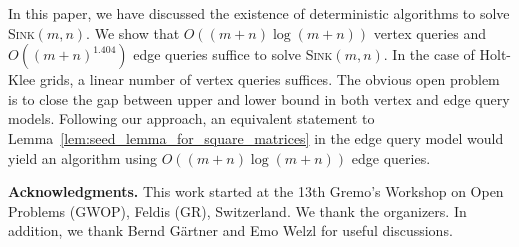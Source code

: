 \documentclass[runningheads,a4paper]{llncs}
\newcommand{\sinkmn}{\textsc{Sink}$(m,n)$\xspace}
\begin{document}
In this paper, we have discussed the existence of deterministic algorithms to solve \sinkmn. 
We show that $O((m+n)\log(m+n))$ vertex queries and $O((m+n)^{1.404})$ edge queries suffice to solve \sinkmn. In the case of Holt-Klee grids, a linear number of vertex queries suffices.
The obvious open problem is to close the gap between upper and lower bound in both vertex and edge query models.
Following our approach, an equivalent statement to Lemma~\ref{lem:seed_lemma_for_square_matrices} in the edge query model would yield an algorithm using $O((m+n)\log(m+n))$ edge queries. 

\vspace{.1in}
\noindent\textbf{Acknowledgments.} 
This work started at the 13th Gremo's Workshop on Open Problems
(GWOP), Feldis (GR), Switzerland. We thank the organizers. In addition, we thank
Bernd G\"{a}rtner and Emo Welzl for useful discussions.
\end{document}
